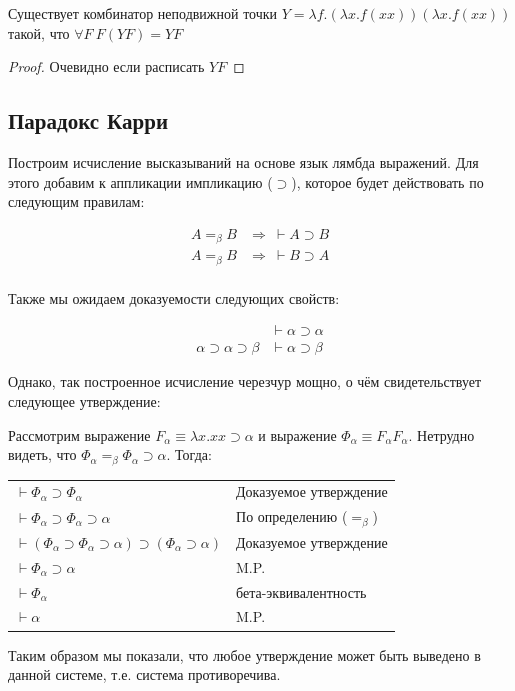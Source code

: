 \begin{theorem}
Существует комбинатор неподвижной точки $Y = \lambda f . (\lambda x . f (x x))
(\lambda x . f (x x))$ такой, что $\forall F \  F (Y F) = Y F$
\end{theorem}
\begin{proof}
Очевидно если расписать $Y F$
\end{proof}


\subsection{Парадокс Карри}

Построим исчисление высказываний на основе язык лямбда выражений. Для этого
добавим к аппликации импликацию ($\supset$), которое будет действовать по
следующим правилам:

\begin{align*}
A =_\beta B &\Rightarrow \ \vdash A \supset B \\
A =_\beta B &\Rightarrow \ \vdash B \supset A \\
\end{align*}

Также мы ожидаем доказуемости следующих свойств:

\begin{align*}
&\vdash \alpha \supset \alpha \\
\alpha \supset \alpha \supset \beta &\vdash \alpha \supset \beta 
\end{align*}

Однако, так построенное исчисление черезчур мощно, о чём свидетельствует
следующее утверждение:

Рассмотрим выражение $F_\alpha \equiv \lambda x. x x \supset \alpha$ 
и выражение $\Phi_\alpha \equiv F_\alpha F_\alpha$.
Нетрудно видеть, что $\Phi_\alpha =_\beta \Phi_\alpha \supset \alpha$.
Тогда: \\

\begin{tabular}{ll}
$\vdash \Phi_\alpha \supset \Phi_\alpha$ & Доказуемое утверждение\\
$\vdash \Phi_\alpha \supset \Phi_\alpha \supset \alpha$ & По определению ($=_\beta$)\\
$\vdash (\Phi_\alpha \supset \Phi_\alpha \supset \alpha) \supset (\Phi_\alpha \supset \alpha)$ & Доказуемое утверждение\\
$\vdash \Phi_\alpha \supset \alpha$ & M.P.\\
$\vdash \Phi_\alpha$ & бета-эквивалентность\\
$\vdash \alpha$ & M.P.
\end{tabular}

Таким образом мы показали, что любое утверждение может быть выведено в данной
системе, т.е. система противоречива.